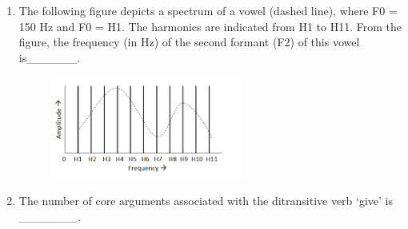 \documentclass[12pt]{article}
\theoremstyle{remark}
\begin{document}
\begin{enumerate}
\begin{multicols}{2}
\begin{enumerate}
        \item 
        \begin{enumerate}[topsep=0pt, itemsep=0pt, parsep=0pt]
            \item Students don't study.
            \item Linguistics students do not study.
        \end{enumerate}
    \end{enumerate}
\end{multicols}
\begin{enumerate}
\end{enumerate}
\hfill{}
\item The following figure depicts a spectrum of a vowel (dashed line), where F0 = 150 Hz and F0 = H1. The harmonics are indicated from H1 to H11. From the figure, the frequency (in Hz) of the second formant (F2) of this vowel is\_\_\_\_\_\_.
\begin{figure}[H]
\centering
\includegraphics[width=0.6\textwidth]{Figs/Q64.png}
\caption{}
\label{fig:3.7}
\end{figure}
\hfill{}
\item The number of core arguments associated with the ditransitive verb ‘give’ is \_\_\_\_\_\_\_.
\hfill{}
\end{enumerate}
\end{document}
